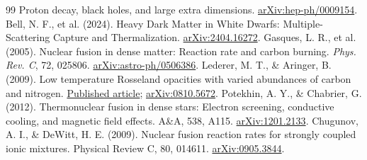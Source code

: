 \documentclass[11pt,letterpaper]{article}
\begin{document}
\begin{thebibliography}{99}
Proton decay, black holes, and large extra dimensions.
\href{https://arxiv.org/abs/hep-ph/0009154}{arXiv:hep-ph/0009154}.
 Bell, N. F., et al. (2024).
Heavy Dark Matter in White Dwarfs: Multiple-Scattering Capture and Thermalization.
\href{https://arxiv.org/abs/2404.16272}{arXiv:2404.16272}.
 Gasques, L. R., et al. (2005).
Nuclear fusion in dense matter: Reaction rate and carbon burning.
\emph{Phys. Rev. C}, 72, 025806.
\href{https://arxiv.org/abs/astro-ph/0506386}{arXiv:astro-ph/0506386}.
 Lederer, M. T., \& Aringer, B. (2009).
Low temperature Rosseland opacities with varied abundances of carbon and nitrogen.
\href{https://doi.org/10.1051/0004-6361:200810576}{Published article};
\href{https://arxiv.org/abs/0810.5672}{arXiv:0810.5672}.
 Potekhin, A. Y., \& Chabrier, G. (2012).
Thermonuclear fusion in dense stars: Electron screening, conductive cooling,
and magnetic field effects. A\&A, 538, A115.
\href{https://arxiv.org/abs/1201.2133}{arXiv:1201.2133}.
 Chugunov, A. I., \& DeWitt, H. E. (2009).
Nuclear fusion reaction rates for strongly coupled ionic mixtures.
Physical Review C, 80, 014611.
\href{https://arxiv.org/abs/0905.3844}{arXiv:0905.3844}.
\end{thebibliography}

\end{document}
